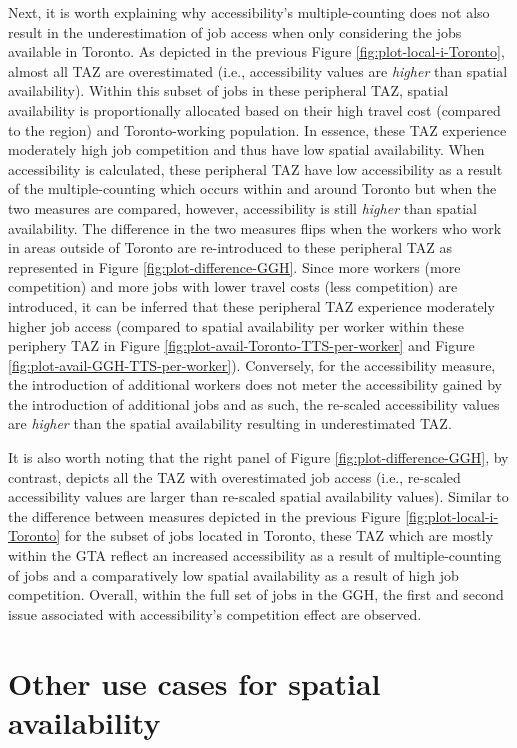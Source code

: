 \documentclass[]{elsarticle} %
\begin{document}
Next, it is worth explaining why accessibility's multiple-counting does
not also result in the underestimation of job access when only
considering the jobs available in Toronto. As depicted in the previous
Figure \ref{fig:plot-local-i-Toronto}, almost all TAZ are overestimated
(i.e., accessibility values are \emph{higher} than spatial
availability). Within this subset of jobs in these peripheral TAZ,
spatial availability is proportionally allocated based on their high
travel cost (compared to the region) and Toronto-working population. In
essence, these TAZ experience moderately high job competition and thus
have low spatial availability. When accessibility is calculated, these
peripheral TAZ have low accessibility as a result of the
multiple-counting which occurs within and around Toronto but when the
two measures are compared, however, accessibility is still \emph{higher}
than spatial availability. The difference in the two measures flips when
the workers who work in areas outside of Toronto are re-introduced to
these peripheral TAZ as represented in Figure
\ref{fig:plot-difference-GGH}. Since more workers (more competition) and
more jobs with lower travel costs (less competition) are introduced, it
can be inferred that these peripheral TAZ experience moderately higher
job access (compared to spatial availability per worker within these
periphery TAZ in Figure \ref{fig:plot-avail-Toronto-TTS-per-worker} and
Figure \ref{fig:plot-avail-GGH-TTS-per-worker}). Conversely, for the
accessibility measure, the introduction of additional workers does not
meter the accessibility gained by the introduction of additional jobs
and as such, the re-scaled accessibility values are \emph{higher} than
the spatial availability resulting in underestimated TAZ.

It is also worth noting that the right panel of Figure
\ref{fig:plot-difference-GGH}, by contrast, depicts all the TAZ with
overestimated job access (i.e., re-scaled accessibility values are
larger than re-scaled spatial availability values). Similar to the
difference between measures depicted in the previous Figure
\ref{fig:plot-local-i-Toronto} for the subset of jobs located in
Toronto, these TAZ which are mostly within the GTA reflect an increased
accessibility as a result of multiple-counting of jobs and a
comparatively low spatial availability as a result of high job
competition. Overall, within the full set of jobs in the GGH, the first
and second issue associated with accessibility's competition effect are
observed.

\hypertarget{other-use-cases-for-spatial-availability}{%
\section{Other use cases for spatial
availability}\label{other-use-cases-for-spatial-availability}}
\end{document}
